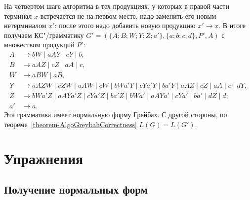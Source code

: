 \begin{myexample}
На четвертом шаге алгоритма в тех продукциях, у которых в правой части терминал $x$ встречается не на первом месте, надо заменить его новым нетерминалом $x'$: после этого надо добавить новую продукцию $x'\to x$. В итоге получаем КС"/грамматику $G' = (\{A;B;W;Y;Z;a'\},\{a;b;c;d\},P',A)$ с множеством продукций $P'$:
\begin{align*}
    A &\to bW \mid aAY \mid cY \mid b, \\
    B &\to aAZ \mid cZ \mid aA \mid c, \\
    W &\to aBW \mid aB, \\
    Y &\to aAZW \mid cZW \mid aAW \mid cW \mid bWa'Y \mid cYa'Y
        \mid ba'Y \mid aAZ \mid cZ \mid aA \mid c \mid dY, \\
    Z &\to bWa'Z \mid aAYa'Z \mid cYa'Z \mid ba'Z \mid bWa'
        \mid aAYa' \mid cYa' \mid ba' \mid dZ \mid d, \\
    a' &\to a.
\end{align*}
Эта грамматика имеет нормальную форму Грейбах. С другой стороны, по теореме~\ref{theorem-AlgoGreybahCorrectness} $L(G)=L(G')$.
\end{myexample}

\section{Упражнения}
\label{Chapter7Exs}

\subsection*{Получение нормальных форм}

